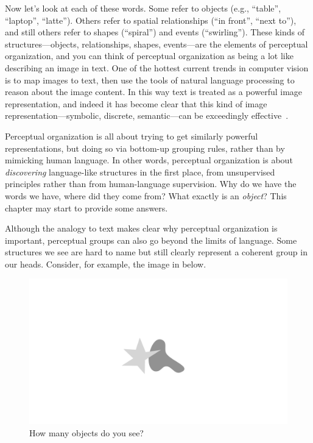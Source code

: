 Now let's look at each of these words. Some refer to objects (e.g., ``table'', ``laptop'', ``latte''). Others refer to spatial relationships (``in front'', ``next to''), and still others refer to shapes (``spiral'') and events (``swirling''). These kinds of structures—objects, relationships, shapes, events—are the elements of perceptual organization, and you can think of perceptual organization as being a lot like describing an image in text. One of the hottest current trends in computer vision is to map images to text, then use the tools of natural language processing to reason about the image content. In this way text is treated as a powerful image representation, and indeed it has become clear that this kind of image representation—symbolic, discrete, semantic—can be exceedingly effective~\cite{alayrac2022flamingo,wu2023visual,gupta2023visual,suris2023vipergpt}.

Perceptual organization is all about trying to get similarly powerful representations, but doing so via bottom-up grouping rules, rather than by mimicking human language. In other words, perceptual organization is about \textit{discovering} language-like structures in the first place, from unsupervised principles rather than from human-language supervision. Why do we have the words we have, where did they come from? What exactly is an \textit{object}? This chapter may start to provide some answers.

Although the analogy to text makes clear why perceptual organization is important, perceptual groups can also go beyond the limits of language. Some structures we see are hard to name but still clearly represent a coherent group in our heads. Consider, for example, the image in \fig{\ref{fig:perceptual_organization:perc_org_nonsemantic_example}} below.
\begin{figure}[h]
    \centerline{
    \includegraphics[width=0.35\linewidth]{./figures/perceptual_organization/perc_org_nonsemantic_example.pdf}
    }
    \caption{How many objects do you see?}
    \label{fig:perceptual_organization:perc_org_nonsemantic_example}
\end{figure}

